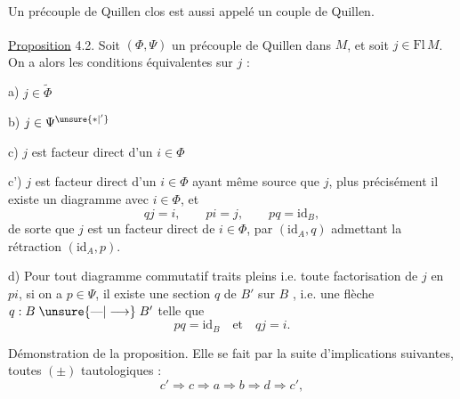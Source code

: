 Un précouple de Quillen clos est aussi appelé un couple de Quillen.

\uline{Proposition} 4.2. Soit $(\Phi,\Psi)$ un précouple de Quillen dans $M$, et soit $j\in\mathrm{Fl}\,M$\textsuperscript{\unsure{*}}. On a alors les conditions équivalentes sur $j$ :

a) $j\in\widetilde\Phi$

b) $j\in\Psi^{\unsure{*|'}}$

c) $j$ est facteur direct d'un $i\in\Phi$

c') $j$ est facteur direct d'un $i\in\Phi$ ayant même source que $j$, plus précisément il existe un diagramme
avec $i\in\Phi$, et
\[
qj=i,\qquad pi=j,\qquad pq=\mathrm{id}_B,
\tag*{(4.2.1)}
\]
de sorte que $j$ est un facteur direct de $i\in\Phi$, par $(\mathrm{id}_A,q)$ admettant la rétraction $(\mathrm{id}_A,p)$.

d) Pour tout diagramme commutatif traits pleins
i.e. toute factorisation de $j$ en $pi$, si on a $p\in\Psi$, il existe une section $q$ de $B'$ sur $B$ , i.e. une flèche $q:B\mathrel{\unsure{\text{---}|\longrightarrow}}B'$ telle que
\[
pq=\mathrm{id}_B\quad\text{et}\quad qj=i.
\]

Démonstration de la proposition. Elle se fait par la suite d'implications suivantes, toutes $(\pm)$ tautologiques :
\[
c'\Longrightarrow c\Longrightarrow a\Longrightarrow b\Longrightarrow d\Longrightarrow c',
\]
